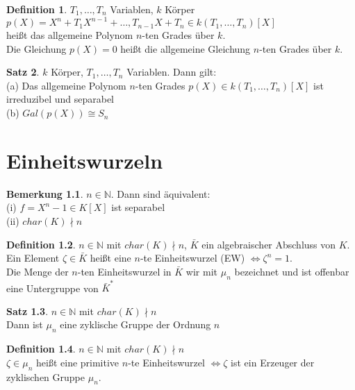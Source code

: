 \documentclass[10pt,a4paper,numbers=endperiod]{scrreprt}
\theoremstyle{definition}
\newtheorem{satz}{Satz}[section]
\newtheorem{defi}[satz]{Definition}
\newtheorem{bem}[satz]{Bemerkung}
\def\NN{{\mathbb N}}
\begin{document}
\begin{defi}
	$T_1, \ldots, T_n$ Variablen, $k$ Körper\\
	$p(X) = X^n + T_1X^{n-1} + \ldots, T_{n-1} X + T_n \in k(T_1, \ldots, T_n)[X]$\\
	heißt das allgemeine Polynom $n$-ten Grades über $k$.\\
	Die Gleichung $p(X) = 0$ heißt die allgemeine Gleichung $n$-ten Grades über $k$.
\end{defi}

\begin{satz}
	$k$ Körper, $T_1, \ldots, T_n$ Variablen. Dann gilt:\\
	(a) Das allgemeine Polynom $n$-ten Grades $p(X) \in k(T_1, \ldots, T_n)[X]$ ist irreduzibel und separabel\\
	(b) $Gal(p(X)) \cong S_n$
\end{satz}


\chapter{Einheitswurzeln} 

\begin{bem}
	$n \in \NN$. Dann sind äquivalent:\\
	(i) $f = X^n -1 \in K[X]$ ist separabel\\
	(ii) $char(K) \nmid n$
\end{bem}

\begin{defi}
	$n \in \NN$ mit $char(K) \nmid n$, $\bar{K}$ ein algebraischer Abschluss von $K$. Ein Element $\zeta \in \bar{K}$ heißt eine $n$-te Einheitswurzel (EW) $\Leftrightarrow \zeta^n = 1$.\\
	Die Menge der $n$-ten Einheitswurzel in $\bar{K}$ wir mit $\mu_n$ bezeichnet und ist offenbar eine Untergruppe von $\bar{K}^*$ 
\end{defi}

\begin{satz}
	$n \in \NN$ mit $char(K) \nmid n$\\
	Dann ist $\mu_n$ eine zyklische Gruppe der Ordnung $n$
\end{satz}

\begin{defi}
	$n \in \NN$ mit $char(K) \nmid n$\\
	$\zeta \in \mu_n$ heißt eine primitive $n$-te Einheitswurzel $\Leftrightarrow \zeta$ ist ein Erzeuger der zyklischen Gruppe $\mu_n$. 
\end{defi}
\end{document}
